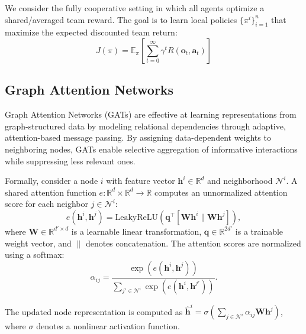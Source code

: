 \documentclass[letterpaper, 10 pt, conference]{ieeeconf}  %
\begin{document}
We consider the fully cooperative setting in which all agents optimize a shared/averaged team reward. The goal is to learn local policies $\{\pi^i\}_{i=1}^n$ that maximize the expected discounted team return:
\begin{equation}\label{eq:objective_function}
    J\left(\pi\right) = \mathbb{E}_{\pi}\left[\sum_{t=0}^{\infty}\gamma^t R(\mathbf{o}_t,\mathbf{a}_t)\right]
\end{equation}


\subsection{Graph Attention Networks}

Graph Attention Networks (GATs) \cite{velivckovic2017graph, brody2021attentive} are effective at learning representations from graph-structured data by modeling relational dependencies through adaptive, attention-based message passing. By assigning data-dependent weights to neighboring nodes, GATs enable selective aggregation of informative interactions while suppressing less relevant ones.

Formally, consider a node $i$ with feature vector $\boldsymbol{h}^i \in \mathbb{R}^d$ and neighborhood $\mathcal{N}^i$. A shared attention function $e : \mathbb{R}^d \times \mathbb{R}^d \to \mathbb{R}$ computes an unnormalized attention score for each neighbor $j \in \mathcal{N}^i$:
\begin{equation} \label{eq:attention_score}
    e(\boldsymbol{h}^i,\boldsymbol{h}^j) = \text{LeakyReLU}\left({\boldsymbol{q}}^\top\left[\boldsymbol{W}\boldsymbol{h}^i\|\boldsymbol{W}\boldsymbol{h}^j\right]\right),
\end{equation}
where $\boldsymbol{W} \in \mathbb{R}^{d' \times d}$ is a learnable linear transformation, ${\boldsymbol{q}} \in \mathbb{R}^{2d'}$ is a trainable weight vector, and $\|$ denotes concatenation. The attention scores are normalized using a softmax:
\begin{equation}\label{eq:norm_attention_score}
    \alpha_{ij} = \frac{\exp\left(e(\boldsymbol{h}^i,\boldsymbol{h}^j)\right)}{\sum_{j'\in\mathcal{N}^i}\exp(e(\boldsymbol{h}^i,\boldsymbol{h}^{j'}))}.
\end{equation}

The updated node representation is computed as
$
\hat{\boldsymbol{h}}^i = \sigma\left(\sum_{j \in \mathcal{N}^i} \alpha_{ij}\boldsymbol{W}\boldsymbol{h}^j\right)$, where $\sigma$ denotes a nonlinear activation function.
\end{document}

